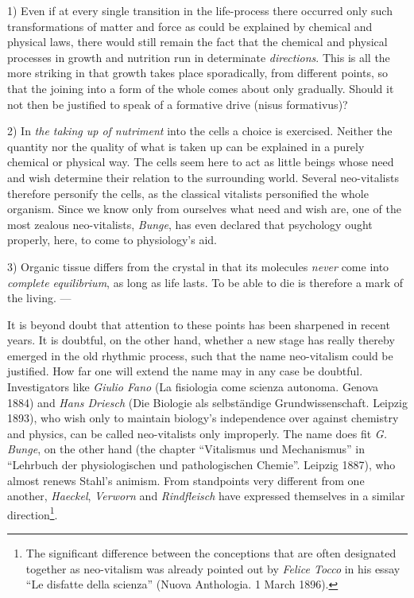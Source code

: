 \documentclass[12pt,a4paper,openany]{book}
\newcommand{\opage}[1]{\marginnote{\footnotesize\textit{[#1]}}}
\begin{document}
1) Even if at every single transition in the life-process there occurred only
such transformations of matter and force as could be explained by chemical and
physical laws, there would still remain the fact that the chemical and physical
processes in growth and nutrition run in determinate \emph{directions}. This is
all the more striking in that growth takes place sporadically, from different
points, so that the joining into a form of the whole comes about only gradually.
Should it not then be justified to speak of a formative drive (nisus
formativus)?

2) In \emph{the taking up of nutriment} into the cells a choice is exercised.
Neither the quantity nor the quality of what is taken up can be explained in a
purely chemical or physical way. The cells seem here to act as little beings
whose need and wish determine their relation to the surrounding world. Several
neo-vitalists therefore personify the cells, as the classical vitalists
personified the whole organism. Since we know only from ourselves what need and
wish are, one of the most zealous neo-vitalists, \emph{Bunge}, has even declared
that psychology ought properly, here, to come to physiology's aid.

3) Organic tissue differs from the crystal in that its molecules \emph{never}
come into \emph{complete equilibrium}, as
\opage{46}long as life lasts. To be able to die is therefore a mark of the living. ---

It is beyond doubt that attention to these points has been sharpened in recent
years. It is doubtful, on the other hand, whether a new stage has really thereby
emerged in the old rhythmic process, such that the name neo-vitalism could be
justified. How far one will extend the name may in any case be doubtful.
Investigators like \emph{Giulio Fano} (La fisiologia come scienza
autonoma. Genova 1884) and \emph{Hans Driesch} (Die Biologie als
selbständige Grundwissenschaft. Leipzig 1893), who wish only to maintain
biology's independence over against chemistry and physics, can be called
neo-vitalists only improperly. The name does fit \emph{G. Bunge}, on the other
hand (the chapter ``Vitalismus und Mechanismus'' in ``Lehrbuch der
physiologischen und pathologischen Chemie''. Leipzig 1887), who almost renews
Stahl's animism. From standpoints very different from one another,
\emph{Haeckel}, \emph{Verworn} and \emph{Rindfleisch} have expressed themselves
in a similar direction\footnote{The significant difference between the
conceptions that are often designated together as neo-vitalism was already
pointed out by \emph{Felice Tocco} in his essay ``Le disfatte della scienza''
(Nuova Anthologia. 1 March 1896).}.
\end{document}
